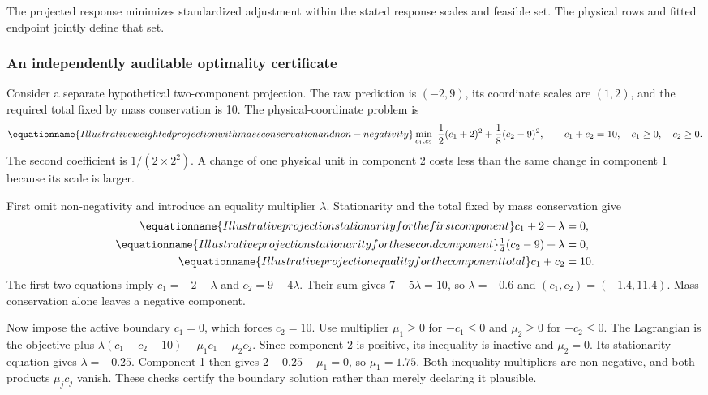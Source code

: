 The projected response minimizes standardized adjustment within the stated response scales and feasible set. The physical rows and fitted endpoint jointly define that set.

\subsubsection{An independently auditable optimality certificate}

Consider a separate hypothetical two-component projection. The raw prediction is $(-2,9)$, its coordinate scales are $(1,2)$, and the required total fixed by mass conservation is 10. The physical-coordinate problem is
\begin{equation}
\equationname{Illustrative weighted projection with mass conservation and non-negativity}
\min_{c_1,c_2}\ \frac12(c_1+2)^2+\frac18(c_2-9)^2,
\qquad c_1+c_2=10,\quad c_1\ge0,\quad c_2\ge0.
\end{equation}
The second coefficient is $1/(2\times2^2)$. A change of one physical unit in component 2 costs less than the same change in component 1 because its scale is larger.

First omit non-negativity and introduce an equality multiplier $\lambda$. Stationarity and the total fixed by mass conservation give
\begin{align}
\equationname{Illustrative projection stationarity for the first component}
c_1+2+\lambda&=0,\\
\equationname{Illustrative projection stationarity for the second component}
\tfrac14(c_2-9)+\lambda&=0,\\
\equationname{Illustrative projection equality for the component total}
c_1+c_2&=10.
\end{align}
The first two equations imply $c_1=-2-\lambda$ and $c_2=9-4\lambda$. Their sum gives $7-5\lambda=10$, so $\lambda=-0.6$ and $(c_1,c_2)=(-1.4,11.4)$. Mass conservation alone leaves a negative component.

Now impose the active boundary $c_1=0$, which forces $c_2=10$. Use multiplier $\mu_1\ge0$ for $-c_1\le0$ and $\mu_2\ge0$ for $-c_2\le0$. The Lagrangian is the objective plus $\lambda(c_1+c_2-10)-\mu_1c_1-\mu_2c_2$. Since component 2 is positive, its inequality is inactive and $\mu_2=0$. Its stationarity equation gives $\lambda=-0.25$. Component 1 then gives $2-0.25-\mu_1=0$, so $\mu_1=1.75$. Both inequality multipliers are non-negative, and both products $\mu_jc_j$ vanish. These checks certify the boundary solution rather than merely declaring it plausible.

